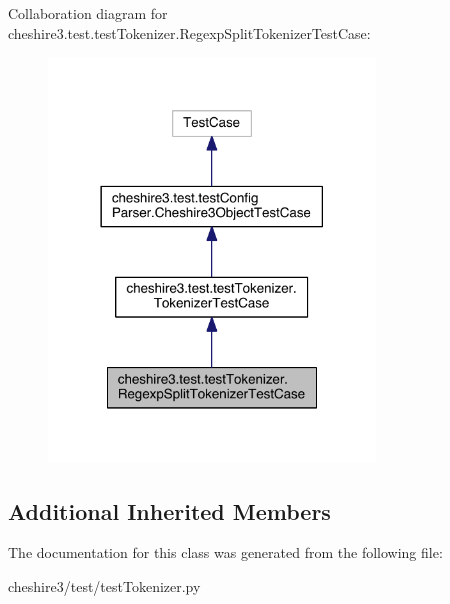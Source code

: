 Collaboration diagram for cheshire3.\-test.\-test\-Tokenizer.\-Regexp\-Split\-Tokenizer\-Test\-Case\-:
\nopagebreak
\begin{figure}[H]
\begin{center}
\leavevmode
\includegraphics[width=246pt]{classcheshire3_1_1test_1_1test_tokenizer_1_1_regexp_split_tokenizer_test_case__coll__graph}
\end{center}
\end{figure}
\subsection*{Additional Inherited Members}


The documentation for this class was generated from the following file\-:\begin{DoxyCompactItemize}
\item 
cheshire3/test/test\-Tokenizer.\-py\end{DoxyCompactItemize}
